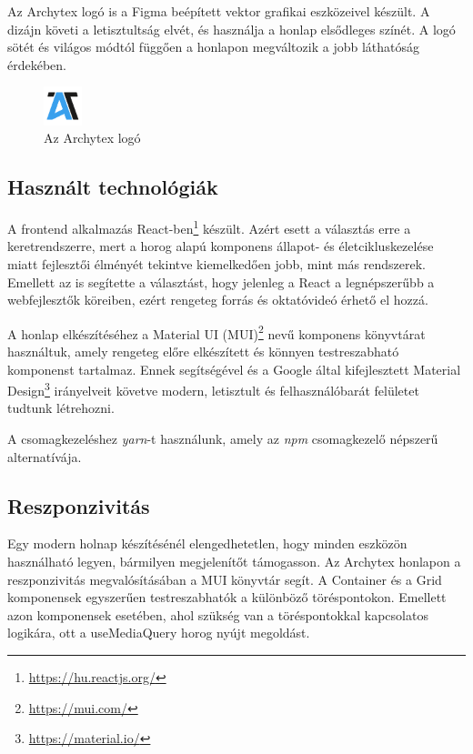 Az Archytex logó is a Figma beépített vektor grafikai eszközeivel készült. A dizájn követi a letisztultság elvét, és használja a honlap elsődleges színét. A logó sötét és világos módtól függően a honlapon megváltozik a jobb láthatóság érdekében.

\begin{figure}[H]
  \centering
  \includegraphics[width=0.1\textwidth]{parts/developer-documentation/frontend/images/logo.png}
  \caption{Az Archytex logó}
\end{figure}

\subsection{Használt technológiák}
A frontend alkalmazás React-ben\footnote{\url{https://hu.reactjs.org/}} készült. Azért esett a választás erre a keretrendszerre, mert a horog alapú komponens állapot- és életcikluskezelése miatt fejlesztői élményét tekintve kiemelkedően jobb, mint más rendszerek. Emellett az is segítette a választást, hogy jelenleg a React a legnépszerűbb a webfejlesztők köreiben\cite{most-used-web-frameworks}, ezért rengeteg forrás és oktatóvideó érhető el hozzá.

A honlap elkészítéséhez a Material UI (MUI)\footnote{\url{https://mui.com/}} nevű komponens könyvtárat használtuk, amely rengeteg előre elkészített és könnyen testreszabható komponenst tartalmaz. Ennek segítségével és a Google által kifejlesztett Material Design\footnote{\url{https://material.io/}} irányelveit követve modern, letisztult és felhasználóbarát felületet tudtunk létrehozni.

A csomagkezeléshez \emph{yarn}-t használunk, amely az \emph{npm} csomagkezelő népszerű alternatívája.

\subsection{Reszponzivitás}
Egy modern holnap készítésénél elengedhetetlen, hogy minden eszközön használható legyen, bármilyen megjelenítőt támogasson. Az Archytex honlapon a reszponzivitás megvalósításában a MUI könyvtár segít. A Container és a Grid komponensek egyszerűen testreszabhatók a különböző töréspontokon. Emellett azon komponensek esetében, ahol szükség van a töréspontokkal kapcsolatos logikára, ott a useMediaQuery horog nyújt megoldást.

